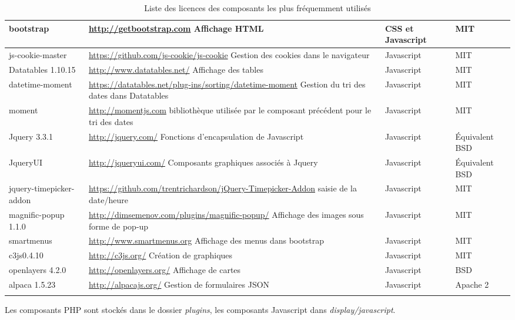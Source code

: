\begin{longtable}{|>{\raggedright\arraybackslash}p{3cm}|p{6cm}|>{\raggedright\arraybackslash}p{1.5cm}|>{\raggedright\arraybackslash}p{1.5cm}|}
bootstrap & \url{http://getbootstrap.com} Affichage HTML & CSS et Javascript &  MIT\\
\hline
js-cookie-master & \url{https://github.com/js-cookie/js-cookie} Gestion des cookies dans le navigateur & Javascript & MIT \\
\hline
Datatables 1.10.15 & \url{http://www.datatables.net/} Affichage des tables & Javascript & MIT \\
\hline
datetime-moment & \url{https://datatables.net/plug-ins/sorting/datetime-moment} Gestion du tri des dates dans Datatables & Javascript & MIT\\
\hline
moment & \url{http://momentjs.com} bibliothèque utilisée par le composant précédent pour le tri des dates & Javascript & MIT\\
\hline
Jquery 3.3.1 & \url{http://jquery.com/} Fonctions d'encapsulation de Javascript & Javascript & Équivalent BSD \\
\hline
JqueryUI & \url{http://jqueryui.com/} Composants graphiques associés à Jquery & Javascript & Équivalent BSD \\
\hline
jquery-timepicker-addon & \url{https://github.com/trentrichardson/jQuery-Timepicker-Addon} saisie de la date/heure & Javascript & MIT\\
\hline
magnific-popup 1.1.0 & \url{http://dimsemenov.com/plugins/magnific-popup/} Affichage des images sous forme de pop-up & Javascript & MIT \\
\hline
smartmenus & \url{http://www.smartmenus.org} Affichage des menus dans bootstrap & Javascript & MIT\\
\hline
c3js0.4.10 & \url{http://c3js.org/} Création de graphiques & Javascript & MIT \\
\hline
openlayers 4.2.0 & \url{http://openlayers.org/} Affichage de cartes & Javascript & BSD\\
\hline
alpaca 1.5.23 & \url{http://alpacajs.org/} Gestion de formulaires JSON & Javascript & Apache 2\\
\hline

\caption{Liste des licences des composants les plus fréquemment utilisés}
\end{longtable}

Les composants PHP sont stockés dans le dossier \textit{plugins}, les composants Javascript dans \textit{display/javascript}.